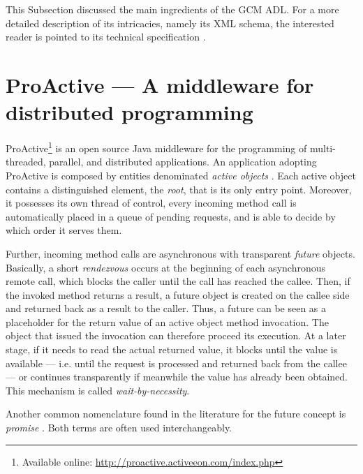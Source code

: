 

		
			This Subsection discussed the main ingredients of the \ac{GCM} \ac{ADL}. For a more detailed
		description of its intricacies, namely its XML schema, 
		the interested reader is pointed to its technical specification \cite{ETSI2009:GCMADL}.	
				
	

\section{ProActive --- A middleware for distributed programming}
\label{sec:proactive}

		ProActive\footnote{Available online: \url{http://proactive.activeeon.com/index.php}} is an open 
	source Java middleware for the programming of multi-threaded, parallel, and distributed 
	applications. An application adopting ProActive is composed by entities denominated \textit{active objects} \cite{AO2007}. Each active object
	contains a distinguished element, the \textit{root}, that is its only entry point. Moreover, it possesses
	its own thread of control, every incoming method call is automatically placed in a queue of pending requests,
	and is able to decide by which order it serves them. 
			
		Further, incoming method calls are asynchronous with transparent \textit{future} objects. 
	Basically, a short \textit{rendezvous} occurs at the beginning of each	asynchronous remote call, which blocks
	the caller until the call has reached the callee. Then,	if the invoked method returns a result, a future object is
    created on the callee side and returned back as a result to the caller. Thus, a future
	can be seen as a placeholder for the return value of an active object method invocation. 
	The object that issued the invocation can therefore proceed its execution. At a later stage,
	if it needs to read the actual returned value, it blocks until the value is available --- i.e. until
	the request is processed and returned back from the callee --- or continues transparently
	if meanwhile the value has already been obtained. This mechanism is called 
	\textit{wait-by-necessity}.

		Another common nomenclature found in the literature for the future concept 
	is \textit{promise} \cite{AO2007}. Both terms are often used interchangeably.
	

